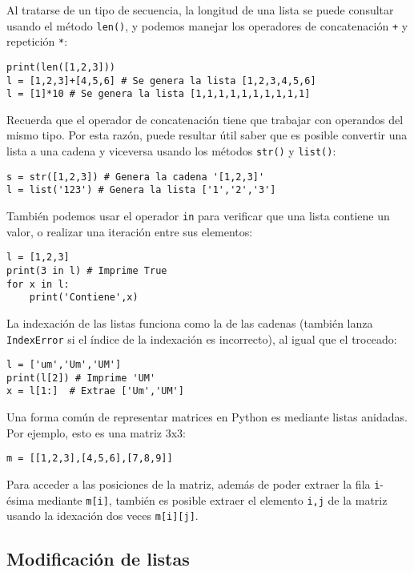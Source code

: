 Al tratarse de un tipo de secuencia, la longitud de una lista se puede consultar usando el método \texttt{len()}, y podemos manejar los operadores de concatenación \texttt{+} y repetición \texttt{*}:

\begin{lstlisting}
print(len([1,2,3]))
l = [1,2,3]+[4,5,6] # Se genera la lista [1,2,3,4,5,6]
l = [1]*10 # Se genera la lista [1,1,1,1,1,1,1,1,1,1]
\end{lstlisting}

Recuerda que el operador de concatenación tiene que trabajar con operandos del mismo tipo. Por esta razón, puede resultar útil saber que es posible convertir una lista a una cadena y viceversa usando los métodos \texttt{str()} y \texttt{list()}:

\begin{lstlisting}
s = str([1,2,3]) # Genera la cadena '[1,2,3]'
l = list('123') # Genera la lista ['1','2','3']
\end{lstlisting}

También podemos usar el operador \texttt{in} para verificar que una lista contiene un valor, o realizar una iteración entre sus elementos:

\begin{lstlisting}
l = [1,2,3]
print(3 in l) # Imprime True
for x in l:
    print('Contiene',x)
\end{lstlisting}

La indexación de las listas funciona como la de las cadenas (también lanza \texttt{IndexError} si el índice de la indexación es incorrecto), al igual que el troceado:

\begin{lstlisting}
l = ['um','Um','UM']
print(l[2]) # Imprime 'UM'
x = l[1:]  # Extrae ['Um','UM']
\end{lstlisting}

Una forma común de representar matrices en Python es mediante listas anidadas. Por ejemplo, esto es una matriz 3x3:

\begin{lstlisting}
m = [[1,2,3],[4,5,6],[7,8,9]]
\end{lstlisting}

Para acceder a las posiciones de la matriz, además de poder extraer la fila \texttt{i}-ésima mediante \texttt{m[i]}, también es posible extraer el elemento \texttt{i,j} de la matriz usando la idexación dos veces \texttt{m[i][j]}.

\subsection{Modificación de listas}

